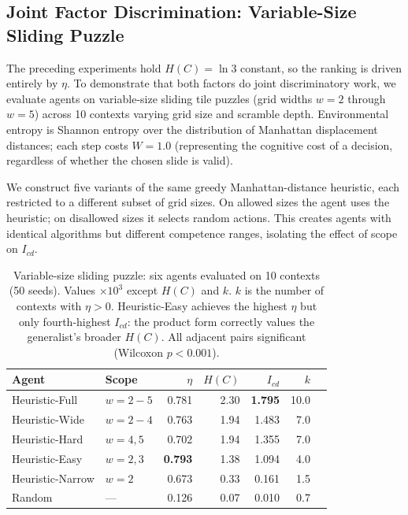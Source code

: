 \documentclass[runningheads,a4paper]{llncs}
\begin{document}
\begin{table}[t]
\centering
\caption{Ablation: removing $H(C)$. All values scaled $\times 10^3$. Without $H(C)$, the single-context specialist receives non-zero scores; with $H(C)$, it correctly scores zero despite comparable efficiency.}
\label{tab:ablation}

\end{table}

\subsection{Joint Factor Discrimination: Variable-Size Sliding Puzzle}
\label{sec:sliding-puzzle}

The preceding experiments hold $H(C) = \ln 3$ constant, so the ranking is driven entirely by $\eta$. To demonstrate that both factors do joint discriminatory work, we evaluate agents on variable-size sliding tile puzzles (grid widths $w = 2$ through $w = 5$) across 10 contexts varying grid size and scramble depth. Environmental entropy is Shannon entropy over the distribution of Manhattan displacement distances; each step costs $W = 1.0$ (representing the cognitive cost of a decision, regardless of whether the chosen slide is valid).

We construct five variants of the same greedy Manhattan-distance heuristic, each restricted to a different subset of grid sizes. On allowed sizes the agent uses the heuristic; on disallowed sizes it selects random actions. This creates agents with identical algorithms but different competence ranges, isolating the effect of scope on $I_{cd}$.

\begin{table}[t]
\centering
\caption{Variable-size sliding puzzle: six agents evaluated on 10 contexts (50 seeds). Values $\times 10^3$ except $H(C)$ and $k$. $k$ is the number of contexts with $\eta > 0$. Heuristic-Easy achieves the highest $\eta$ but only fourth-highest $I_{cd}$: the product form correctly values the generalist's broader $H(C)$. All adjacent pairs significant (Wilcoxon $p < 0.001$).}
\label{tab:sliding-puzzle}
\small
\begin{tabular}{llrrrrr}
\toprule
Agent & Scope & $\eta$ & $H(C)$ & $I_{cd}$ & $k$ \\
\midrule
Heuristic-Full & $w{=}2{-}5$ & 0.781 & 2.30 & \textbf{1.795} & 10.0 \\
Heuristic-Wide & $w{=}2{-}4$ & 0.763 & 1.94 & 1.483 & 7.0 \\
Heuristic-Hard & $w{=}4{,}5$ & 0.702 & 1.94 & 1.355 & 7.0 \\
Heuristic-Easy & $w{=}2{,}3$ & \textbf{0.793} & 1.38 & 1.094 & 4.0 \\
Heuristic-Narrow & $w{=}2$ & 0.673 & 0.33 & 0.161 & 1.5 \\
\midrule
Random & --- & 0.126 & 0.07 & 0.010 & 0.7 \\
\bottomrule
\end{tabular}
\end{table}
\end{document}
